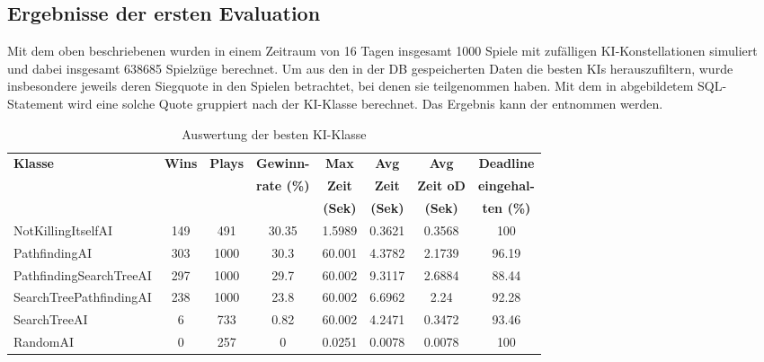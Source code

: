 \subsection{Ergebnisse der ersten Evaluation}
\label{subsec:erste-evaluation}

Mit dem oben beschriebenen  wurden in einem Zeitraum von 16 Tagen insgesamt 1000 Spiele
mit zufälligen \ac{KI}-Konstellationen simuliert und dabei insgesamt 638685 Spielzüge berechnet.
Um aus den in der \ac{DB} gespeicherten Daten die besten \ac{KI}s herauszufiltern, wurde insbesondere jeweils deren
Siegquote in den Spielen betrachtet, bei denen sie teilgenommen haben.
Mit dem in  abgebildetem SQL-Statement wird eine solche Quote gruppiert nach der \ac{KI}-Klasse
berechnet.
Das Ergebnis kann der  entnommen werden.

\begin{table}[htb]
    \centering
    \begin{tabularx}{\textwidth}{|X|c|c|c|c|c|c|c|}
        \hline
		\textbf{Klasse} & \textbf{Wins} & \textbf{Plays} & \textbf{Gewinn-}   & \textbf{Max}   & \textbf{Avg}   & \textbf{Avg}     & \textbf{Deadline} \\
                        &               &                & \textbf{rate (\%)} & \textbf{Zeit}  & \textbf{Zeit}  & \textbf{Zeit oD} & \textbf{eingehal-} \\
                        &               &                &                    & \textbf{(Sek)} & \textbf{(Sek)} & \textbf{(Sek)}   & \textbf{ten (\%)} \\ \hline
        Not\-Killing\-Itself\-AI & 149 & 491 & 30.35 & 1.5989 & 0.3621 & 0.3568 & 100 \\ \hline
        Path\-finding\-AI & 303 & 1000 & 30.3 & 60.001 & 4.3782 & 2.1739 & 96.19 \\ \hline
		Path\-finding\-Search\-Tree\-AI & 297 & 1000 & 29.7 & 60.002 & 9.3117 & 2.6884 & 88.44 \\ \hline
		Search\-Tree\-Path\-finding\-AI & 238 & 1000 & 23.8 & 60.002 & 6.6962 & 2.24 & 92.28 \\ \hline
		Search\-Tree\-AI & 6 & 733 & 0.82 & 60.002 & 4.2471 & 0.3472 & 93.46 \\ \hline
		Random\-AI & 0 & 257 & 0 & 0.0251 & 0.0078 & 0.0078 & 100 \\ \hline
    \end{tabularx}
    \caption{Auswertung der besten \ac{KI}-Klasse}
    \label{tab:evaluation-ki-klasse}
\end{table}

